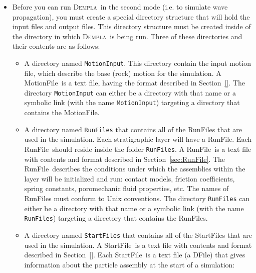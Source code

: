 \documentclass[letterpaper,11pt]{article}
\newcommand{\Dempla}{\textsc{Dempla}}
\newcommand{\RunFile}{\textsf{RunFile}}
\newcommand{\StartFile}{\textsf{StartFile}}
\newcommand{\DFile}{\textsf{DFile}}
\newcommand{\MotionFile}{\textsf{MotionFile}}
\begin{document}
\begin{itemize}
    and the initial particle arrangement (sizes, positions, etc.,
    see Section~\ref{sec:startfileD}).
    A \textsf{StartFile} may be of either ASCII or binary type
    (Table~\ref{table:files}).  
  \item
    Before you can run \Dempla\ in the second mode
    (i.e. to simulate wave propagation),
    you must create a special directory structure that will
    hold the input files and output files.
    This directory structure must be created inside of
    the directory in which \Dempla\ is being run.
    Three of these directories and their contents are
    as follows:
%
    \begin{itemize}
      \item
        A directory named \texttt{MotionInput}.
        This directory contain the input motion
        file, which describe the base (rock) motion
        for the simulation.
        A \MotionFile\ is a text file, having the
        format described in Section~\ref{}.
        The directory \texttt{MotionInput} can either
        be a directory with that name or a symbolic link
        (with the name \texttt{MotionInput}) targeting
        a directory that contains the \MotionFile.
      \item
        A directory named \texttt{RunFiles} that
        contains all of the \RunFile s that are used in
        the simulation.
        Each stratigraphic layer will have a \RunFile.
        Each \RunFile\ should reside inside the
        folder \texttt{RunFiles}.
        A \RunFile\ is a text file with
        contents and format described in Section~\ref{sec:RunFile}.
        The \RunFile\ describes
        the conditions under which the
        assemblies within the layer will be initialized
        and run:
        contact models,
        friction coefficients, spring constants,
        poromechanic fluid properties, etc.
        The names of \RunFile s must conform
        to Unix conventions.
        The directory \texttt{RunFiles} can either
        be a directory with that name or a symbolic link
        (with the name \texttt{RunFiles}) targeting
        a directory that contains the \RunFile s.
      \item
        A directory named \texttt{StartFiles} that
        contains all of the \StartFile s that are used
        in the simulation.
        A \StartFile\ is a text file with
        contents and format described in Section~\ref{}.
        Each \StartFile\ is a text file (a \DFile) that
        gives information about the particle assembly
        at the start of a simulation:

\end{itemize}
\end{itemize}
\end{document}
